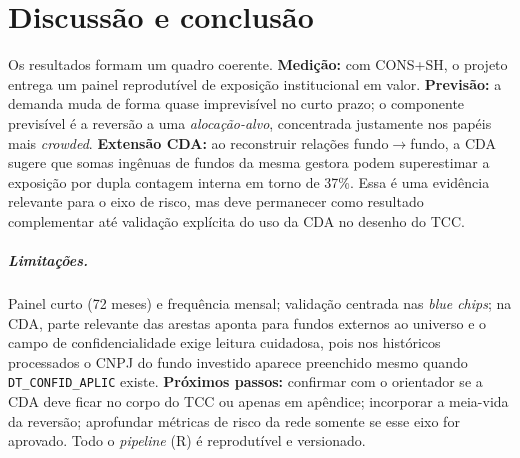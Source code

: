 \documentclass[12pt,a4paper]{report}
\begin{document}
\chapter{Discussão e conclusão}\label{cap:disc}
Os resultados formam um quadro coerente. \textbf{Medição:} com CONS+SH, o projeto entrega um painel
reprodutível de exposição institucional em valor. \textbf{Previsão:} a demanda muda de forma quase
imprevisível no curto prazo; o componente previsível é a reversão a uma \emph{alocação-alvo}, concentrada
justamente nos papéis mais \emph{crowded}. \textbf{Extensão CDA:} ao reconstruir relações fundo$\to$fundo, a
CDA sugere que somas ingênuas de fundos da mesma gestora podem superestimar a exposição por dupla contagem
interna em torno de 37\%. Essa é uma evidência relevante para o eixo de risco, mas deve permanecer como
resultado complementar até validação explícita do uso da CDA no desenho do TCC.

\paragraph{Limitações.} Painel curto (72 meses) e frequência mensal; validação centrada nas \emph{blue chips};
na CDA, parte relevante das arestas aponta para fundos externos ao universo e o campo de confidencialidade
exige leitura cuidadosa, pois nos históricos processados o CNPJ do fundo investido aparece preenchido mesmo
quando \texttt{DT\_CONFID\_APLIC} existe. \textbf{Próximos passos:} confirmar com o orientador se a CDA deve
ficar no corpo do TCC ou apenas em apêndice; incorporar a meia-vida da reversão; aprofundar métricas de risco
da rede somente se esse eixo for aprovado.
Todo o \emph{pipeline} (R) é reprodutível e versionado.



\end{document}
